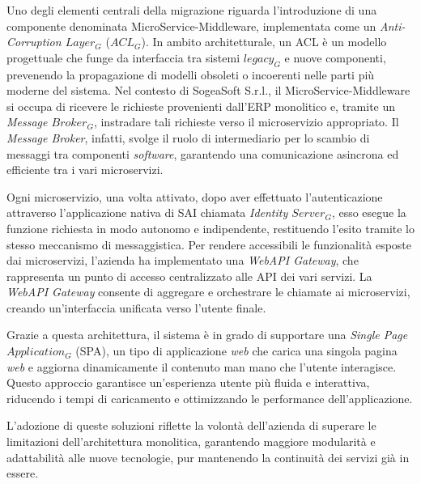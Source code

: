         \vspace{0.2 em}
        \noindent Uno degli elementi centrali della migrazione riguarda l'introduzione di una componente denominata MicroService-Middleware, implementata come un \textit{Anti-Corruption $Layer_G$} ($ACL_G$). In ambito architetturale, un ACL è un modello progettuale che funge da interfaccia tra sistemi $legacy_G$ e nuove componenti, prevenendo la propagazione di modelli obsoleti o incoerenti nelle parti più moderne del sistema. Nel contesto di SogeaSoft S.r.l., il MicroService-Middleware si occupa di ricevere le richieste provenienti dall'ERP monolitico e, tramite un \textit{Message $Broker_G$}, instradare tali richieste verso il microservizio appropriato. Il \textit{Message Broker}, infatti, svolge il ruolo di intermediario per lo scambio di messaggi tra componenti \textit{software}, garantendo una comunicazione asincrona ed efficiente tra i vari microservizi.  

        \vspace{0.2 em}
        \noindent Ogni microservizio, una volta attivato, dopo aver effettuato l'autenticazione attraverso l'applicazione nativa di SAI chiamata \textit{Identity $Server_G$}, esso esegue la funzione richiesta in modo autonomo e indipendente, restituendo l’esito tramite lo stesso meccanismo di messaggistica. Per rendere accessibili le funzionalità esposte dai microservizi, l'azienda ha implementato una \textit{WebAPI Gateway}, che rappresenta un punto di accesso centralizzato alle API dei vari servizi. La \textit{WebAPI Gateway} consente di aggregare e orchestrare le chiamate ai microservizi, creando un'interfaccia unificata verso l'utente finale.  

        \vspace{0.2 em}
        \noindent Grazie a questa architettura, il sistema è in grado di supportare una \textit{Single Page $Application_G$} (SPA), un tipo di applicazione \textit{web} che carica una singola pagina \textit{web} e aggiorna dinamicamente il contenuto man mano che l'utente interagisce. Questo approccio garantisce un'esperienza utente più fluida e interattiva, riducendo i tempi di caricamento e ottimizzando le performance dell'applicazione.  

        \vspace{0.2 em}
        \noindent L'adozione di queste soluzioni riflette la volontà dell'azienda di superare le limitazioni dell'architettura monolitica, garantendo maggiore modularità e adattabilità alle nuove tecnologie, pur mantenendo la continuità dei servizi già in essere.

